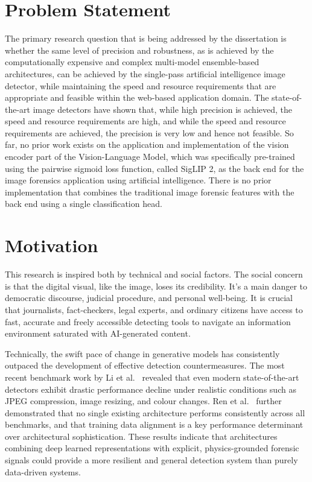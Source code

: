 \section{Problem Statement}

The primary research question that is being addressed by the dissertation is whether the same level of precision and robustness, as is achieved by the computationally expensive and complex multi-model ensemble-based architectures, can be achieved by the single-pass artificial intelligence image detector, while maintaining the speed and resource requirements that are appropriate and feasible within the web-based application domain. The state-of-the-art image detectors have shown that, while high precision is achieved, the speed and resource requirements are high, and while the speed and resource requirements are achieved, the precision is very low and hence not feasible. So far, no prior work exists on the application and implementation of the vision encoder part of the Vision-Language Model, which was specifically pre-trained using the pairwise sigmoid loss function, called SigLIP 2, as the back end for the image forensics application using artificial intelligence. There is no prior implementation that combines the traditional image forensic features with the back end using a single classification head.

\section{Motivation}

This research is inspired both by technical and social factors. The social concern is that the digital visual, like the image, loses its credibility. It's a main danger to democratic discourse, judicial procedure, and personal well-being. It is crucial that journalists, fact-checkers, legal experts, and ordinary citizens have access to fast, accurate and freely accessible detecting tools to navigate an information environment saturated with AI-generated content.

Technically, the swift pace of change in generative models has consistently outpaced the development of effective detection countermeasures. The most recent benchmark work by Li et al.~\cite{li2025aigibench} revealed that even modern state-of-the-art detectors exhibit drastic performance decline under realistic conditions such as JPEG compression, image resizing, and colour changes. Ren et al.~\cite{ren2026benchmark} further demonstrated that no single existing architecture performs consistently across all benchmarks, and that training data alignment is a key performance determinant over architectural sophistication. These results indicate that architectures combining deep learned representations with explicit, physics-grounded forensic signals could provide a more resilient and general detection system than purely data-driven systems.

